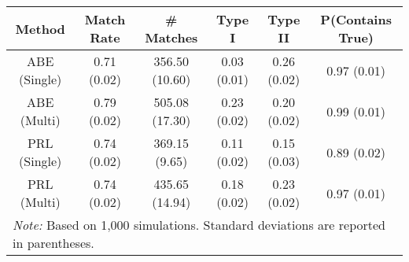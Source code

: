 
\begin{tabular}{cccccc}
\toprule
Method & Match Rate & \# Matches & Type I & Type II & P(Contains True)\\
\midrule
ABE (Single) & 0.71 (0.02) & 356.50 (10.60) & 0.03 (0.01) & 0.26 (0.02) & 0.97 (0.01)\\
ABE (Multi) & 0.79 (0.02) & 505.08 (17.30) & 0.23 (0.02) & 0.20 (0.02) & 0.99 (0.01)\\
PRL (Single) & 0.74 (0.02) & 369.15 (9.65) & 0.11 (0.02) & 0.15 (0.03) & 0.89 (0.02)\\
PRL (Multi) & 0.74 (0.02) & 435.65 (14.94) & 0.18 (0.02) & 0.23 (0.02) & 0.97 (0.01)\\
\bottomrule
\multicolumn{6}{l}{\textit{Note: } Based on 1,000 simulations. Standard deviations are reported in parentheses.}\\
\end{tabular}
